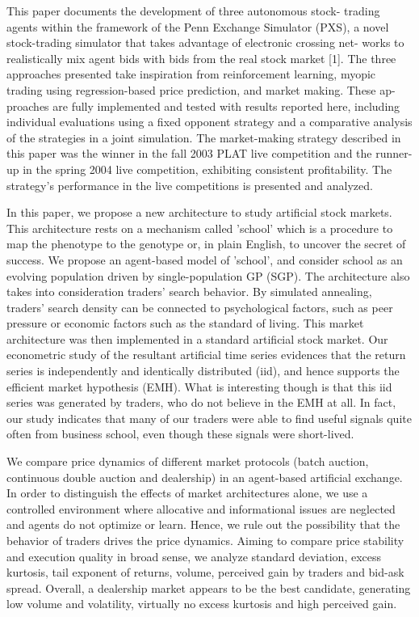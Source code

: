 \cite{Sherstov2005} This paper documents the development of three autonomous
stock- trading agents within the framework of the Penn Exchange Simulator (PXS),
a novel stock-trading simulator that takes advantage of electronic crossing net-
works to realistically mix agent bids with bids from the real stock market
[1]. The three approaches presented take inspiration from reinforcement
learning, myopic trading using regression-based price prediction, and market
making. These ap- proaches are fully implemented and tested with results
reported here, including individual evaluations using a fixed opponent strategy
and a comparative analysis of the strategies in a joint simulation. The
market-making strategy described in this paper was the winner in the fall 2003
PLAT live competition and the runner- up in the spring 2004 live competition,
exhibiting consistent profitability. The strategy's performance in the live
competitions is presented and analyzed.

\cite{Chen2001} In this paper, we propose a new architecture to study artificial
stock markets. This architecture rests on a mechanism called 'school' which is a
procedure to map the phenotype to the genotype or, in plain English, to uncover
the secret of success. We propose an agent-based model of 'school', and consider
school as an evolving population driven by single-population GP (SGP). The
architecture also takes into consideration traders' search behavior. By
simulated annealing, traders' search density can be connected to psychological
factors, such as peer pressure or economic factors such as the standard of
living. This market architecture was then implemented in a standard artificial
stock market. Our econometric study of the resultant artificial time series
evidences that the return series is independently and identically distributed
(iid), and hence supports the efficient market hypothesis (EMH). What is
interesting though is that this iid series was generated by traders, who do not
believe in the EMH at all. In fact, our study indicates that many of our traders
were able to find useful signals quite often from business school, even though
these signals were short-lived.

\cite{Pellizzari2007} We compare price dynamics of different market protocols
(batch auction, continuous double auction and dealership) in an agent-based
artificial exchange. In order to distinguish the effects of market architectures
alone, we use a controlled environment where allocative and informational issues
are neglected and agents do not optimize or learn. Hence, we rule out the
possibility that the behavior of traders drives the price dynamics. Aiming to
compare price stability and execution quality in broad sense, we analyze
standard deviation, excess kurtosis, tail exponent of returns, volume, perceived
gain by traders and bid-ask spread. Overall, a dealership market appears to be
the best candidate, generating low volume and volatility, virtually no excess
kurtosis and high perceived gain.



